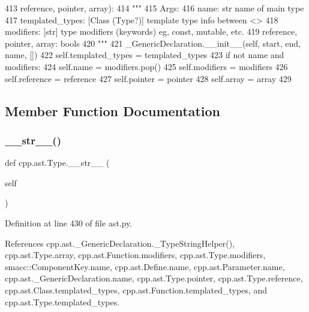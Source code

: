 \begin{DoxyCode}
413                  reference, pointer, array):
414         \textcolor{stringliteral}{"""}
415 \textcolor{stringliteral}{        Args:}
416 \textcolor{stringliteral}{          name: str name of main type}
417 \textcolor{stringliteral}{          templated\_types: [Class (Type?)] template type info between <>}
418 \textcolor{stringliteral}{          modifiers: [str] type modifiers (keywords) eg, const, mutable, etc.}
419 \textcolor{stringliteral}{          reference, pointer, array: bools}
420 \textcolor{stringliteral}{        """}
421         \_GenericDeclaration.\_\_init\_\_(self, start, end, name, [])
422         self.templated\_types = templated\_types
423         \textcolor{keywordflow}{if} \textcolor{keywordflow}{not} name \textcolor{keywordflow}{and} modifiers:
424             self.name = modifiers.pop()
425         self.modifiers = modifiers
426         self.reference = reference
427         self.pointer = pointer
428         self.array = array
429 
\end{DoxyCode}


\subsection{Member Function Documentation}
\mbox{\label{classcpp_1_1ast_1_1Type_a1a10eff21f6150b7e14bde3788fa069b}} 
\subsubsection{\texorpdfstring{\+\_\+\+\_\+str\+\_\+\+\_\+()}{\_\_str\_\_()}}
{\footnotesize\ttfamily def cpp.\+ast.\+Type.\+\_\+\+\_\+str\+\_\+\+\_\+ (\begin{DoxyParamCaption}\item[{}]{self }\end{DoxyParamCaption})}



Definition at line 430 of file ast.\+py.



References cpp.\+ast.\+\_\+\+Generic\+Declaration.\+\_\+\+Type\+String\+Helper(), cpp.\+ast.\+Type.\+array, cpp.\+ast.\+Function.\+modifiers, cpp.\+ast.\+Type.\+modifiers, smacc\+::\+Component\+Key.\+name, cpp.\+ast.\+Define.\+name, cpp.\+ast.\+Parameter.\+name, cpp.\+ast.\+\_\+\+Generic\+Declaration.\+name, cpp.\+ast.\+Type.\+pointer, cpp.\+ast.\+Type.\+reference, cpp.\+ast.\+Class.\+templated\+\_\+types, cpp.\+ast.\+Function.\+templated\+\_\+types, and cpp.\+ast.\+Type.\+templated\+\_\+types.


